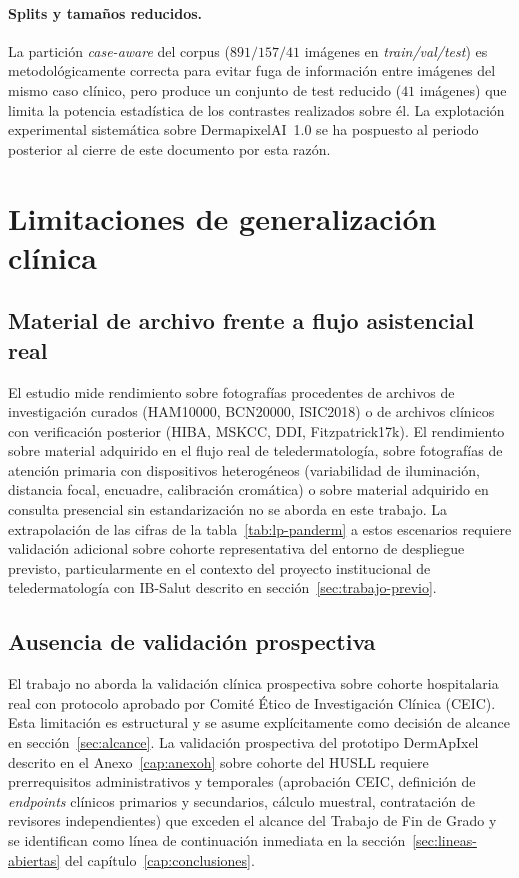 \paragraph{Splits y tamaños reducidos.}
La partición \emph{case-aware} del corpus
($891 / 157 / 41$ imágenes en \emph{train/val/test}) es
metodológicamente correcta para evitar fuga de información entre
imágenes del mismo caso clínico, pero produce un conjunto de test
reducido ($41$ imágenes) que limita la potencia estadística de
los contrastes realizados sobre él. La explotación experimental
sistemática sobre DermapixelAI~1.0 se ha pospuesto al periodo
posterior al cierre de este documento por esta razón.

\section{Limitaciones de generalización clínica}
\label{sec:lim-clinica}

\subsection{Material de archivo frente a flujo asistencial real}
\label{sec:lim-archivo}

El estudio mide rendimiento sobre fotografías procedentes de
archivos de investigación curados (HAM10000, BCN20000, ISIC2018) o
de archivos clínicos con verificación posterior (HIBA, MSKCC, DDI,
Fitzpatrick17k). El rendimiento sobre material adquirido en el
flujo real de teledermatología, sobre fotografías de atención
primaria con dispositivos heterogéneos (variabilidad de
iluminación, distancia focal, encuadre, calibración cromática) o
sobre material adquirido en consulta presencial sin estandarización
no se aborda en este trabajo. La extrapolación de las cifras de la
tabla~\ref{tab:lp-panderm} a estos escenarios requiere validación
adicional sobre cohorte representativa del entorno de despliegue
previsto, particularmente en el contexto del proyecto institucional
de teledermatología con IB-Salut descrito en
secci\'on~\ref{sec:trabajo-previo}.

\subsection{Ausencia de validación prospectiva}
\label{sec:lim-prospectivo}

El trabajo no aborda la validación clínica prospectiva sobre
cohorte hospitalaria real con protocolo aprobado por Comité Ético
de Investigación Clínica (CEIC). Esta limitación es estructural y
se asume explícitamente como decisión de alcance en
secci\'on~\ref{sec:alcance}. La validación prospectiva del prototipo
DermApIxel descrito en el Anexo~\ref{cap:anexoh} sobre cohorte del
HUSLL requiere prerrequisitos administrativos y temporales
(aprobación CEIC, definición de \emph{endpoints} clínicos
primarios y secundarios, cálculo muestral, contratación de
revisores independientes) que exceden el alcance del Trabajo de
Fin de Grado y se identifican como línea de continuación inmediata
en la secci\'on~\ref{sec:lineas-abiertas} del capítulo~\ref{cap:conclusiones}.

